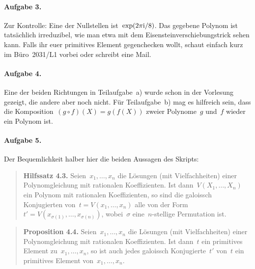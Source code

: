 \documentclass{../algblatt}
\begin{document}
\paragraph{Aufgabe 3.} Zur Kontrolle: Eine der Nullstellen
ist~$\exp(2\pi\mathrm{i}/8)$. Das gegebene Polynom ist tatsächlich irreduzibel, wie man
etwa mit dem Eisensteinverschiebungstrick sehen kann. Falls ihr euer primitives
Element gegenchecken wollt, schaut einfach kurz im Büro~2031/L1 vorbei oder
schreibt eine Mail.

\paragraph{Aufgabe 4.} Eine der beiden Richtungen in Teilaufgabe~a) wurde schon
in der Vorlesung gezeigt, die andere aber noch nicht. Für Teilaufgabe~b) mag es
hilfreich sein, dass die Komposition~$(g \circ f)(X) = g(f(X))$ zweier
Polynome~$g$ und~$f$ wieder ein Polynom ist.

\paragraph{Aufgabe 5.} Der Bequemlichkeit halber hier die beiden Aussagen des
Skripts:
\begin{quote}
\textbf{Hilfssatz 4.3.}
Seien~$x_1,\ldots,x_n$ die Lösungen (mit Vielfachheiten) einer Polynomgleichung
mit rationalen Koeffizienten. Ist dann~$V(X_1,\ldots,X_n)$ ein Polynom mit
rationalen Koeffizienten, so sind die galoissch Konjugierten von~$t =
V(x_1,\ldots,x_n)$ alle von der Form~$t' =
V(x_{\sigma(1)},\ldots,x_{\sigma(n)})$, wobei~$\sigma$ eine~$n$-stellige
Permutation ist.
\end{quote}

\begin{quote}
\textbf{Proposition 4.4.}
Seien~$x_1,\ldots,x_n$ die Lösungen (mit Vielfachheiten) einer Polynomgleichung
mit rationalen Koeffizienten. Ist dann~$t$ ein primitives Element
zu~$x_1,\ldots,x_n$, so ist auch jedes galoissch Konjugierte~$t'$ von~$t$ ein
primitives Element von~$x_1,\ldots,x_n$.
\end{quote}
\end{document}
